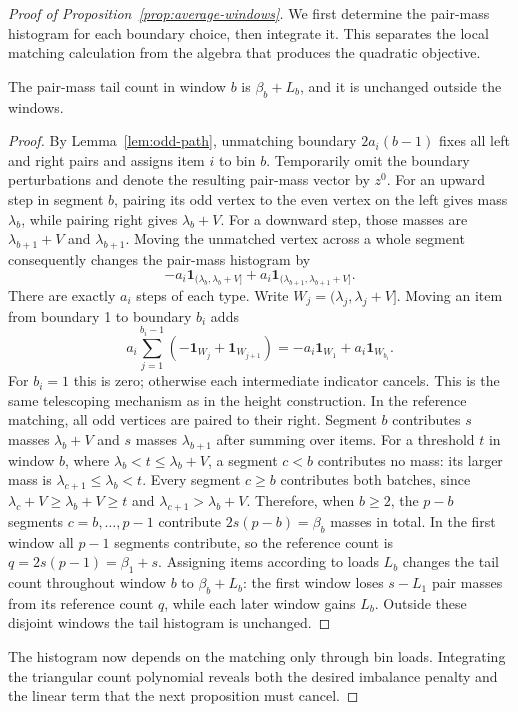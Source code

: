 \begin{proof}[Proof of Proposition~\ref{prop:average-windows}]
We first determine the pair-mass histogram for each boundary choice,
then integrate it. This separates the local matching calculation
from the algebra that produces the quadratic objective.

\begin{claim}
\label{clm:average-mass-transfer}
The pair-mass tail count in window $b$ is $\beta_b+L_b$, and it is unchanged outside the windows.
\end{claim}
\begin{proof}
By Lemma~\ref{lem:odd-path}, unmatching boundary $2a_i(b-1)$
fixes all left and right pairs and assigns item $i$ to bin $b$.
Temporarily omit the boundary perturbations and denote the
resulting pair-mass vector by $z^0$.
For an upward step in segment $b$, pairing its odd vertex
to the even vertex on the left gives mass $\lambda_b$,
while pairing right gives $\lambda_b+V$.
For a downward step, those masses are
$\lambda_{b+1}+V$ and $\lambda_{b+1}$.
Moving the unmatched vertex across a whole segment consequently
changes the pair-mass histogram by
\[
 -a_i\mathbf1_{(\lambda_b,\lambda_b+V]}+
  a_i\mathbf1_{(\lambda_{b+1},\lambda_{b+1}+V]}.
\]
There are exactly $a_i$ steps of each type.
Write $W_j=(\lambda_j,\lambda_j+V]$. Moving an item from
boundary 1 to boundary $b_i$ adds
\[
 a_i\sum_{j=1}^{b_i-1}
       (-\mathbf1_{W_j}+\mathbf1_{W_{j+1}})
 =-a_i\mathbf1_{W_1}+a_i\mathbf1_{W_{b_i}}.
\]
For $b_i=1$ this is zero; otherwise each intermediate indicator
cancels. This is the same telescoping mechanism as in the height
construction.
In the reference matching, all odd vertices are paired to their
right. Segment $b$ contributes $s$ masses $\lambda_b+V$ and
$s$ masses $\lambda_{b+1}$ after summing over items.
For a threshold $t$ in window $b$, where
$\lambda_b<t\le\lambda_b+V$, a segment $c<b$ contributes no mass:
its larger mass is $\lambda_{c+1}\le\lambda_b<t$. Every segment
$c\ge b$ contributes both batches, since
$\lambda_c+V\ge\lambda_b+V\ge t$ and
$\lambda_{c+1}>\lambda_b+V$. Therefore, when $b\ge2$, the
$p-b$ segments $c=b,\ldots,p-1$ contribute $2s(p-b)=\beta_b$
masses in total. In the first window all $p-1$ segments contribute,
so the reference count is $q=2s(p-1)=\beta_1+s$.
Assigning items according to loads $L_b$
changes the tail count throughout window $b$ to
$\beta_b+L_b$: the first window loses $s-L_1$ pair masses from its
reference count $q$, while each later window gains $L_b$.
Outside these disjoint windows the tail histogram is unchanged.
\end{proof}
The histogram now depends on the matching only through bin loads.
Integrating the triangular count polynomial reveals both the desired
imbalance penalty and the linear term that the next proposition
must cancel.


\end{proof}
